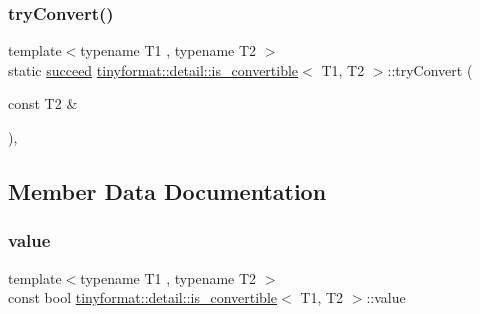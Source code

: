 \mbox{\label{structtinyformat_1_1detail_1_1is__convertible_ad75043563f9d33d477ca134c7d48d942}} 
\subsubsection{\texorpdfstring{try\+Convert()}{tryConvert()}\hspace{0.1cm}{\footnotesize\ttfamily [2/2]}}
{\footnotesize\ttfamily template$<$typename T1 , typename T2 $>$ \\
static \mbox{\hyperlink{structtinyformat_1_1detail_1_1is__convertible_1_1succeed}{succeed}} \mbox{\hyperlink{structtinyformat_1_1detail_1_1is__convertible}{tinyformat\+::detail\+::is\+\_\+convertible}}$<$ T1, T2 $>$\+::try\+Convert (\begin{DoxyParamCaption}\item[{const T2 \&}]{ }\end{DoxyParamCaption})\hspace{0.3cm}{\ttfamily [static]}, {\ttfamily [private]}}



\subsection{Member Data Documentation}
\mbox{\label{structtinyformat_1_1detail_1_1is__convertible_a399ca4333bd68f88a5d5a2430f804df2}} 
\subsubsection{\texorpdfstring{value}{value}}
{\footnotesize\ttfamily template$<$typename T1 , typename T2 $>$ \\
const bool \mbox{\hyperlink{structtinyformat_1_1detail_1_1is__convertible}{tinyformat\+::detail\+::is\+\_\+convertible}}$<$ T1, T2 $>$\+::value\hspace{0.3cm}{\ttfamily [static]}}

